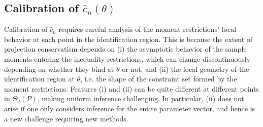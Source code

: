 \documentclass[letterpaper,11pt]{article}
\theoremstyle{myplain}
\theoremstyle{mydefinition}
\theoremstyle{myremark}
\numberwithin{equation}{section}
\numberwithin{figure}{section}
\begin{document}
\subsection{Calibration of $\hat{c}_n(\theta)$}\label{sec:boot}
Calibration of $\hat{c}_n$ requires careful analysis of the moment restrictions' local behavior at each point in the identification region.
This is because the extent of projection conservatism depends on (i) the asymptotic behavior of the sample moments entering the inequality restrictions, which can change discontinuously depending on whether they bind at $\theta$ or not, and (ii) the local geometry of the identification region at $\theta$, i.e. the shape of the constraint set formed by the moment restrictions. Features (i) and (ii) can be quite different at different points in $\Theta_I(P)$, making uniform inference challenging. In particular, (ii) does not arise if one only considers inference for the entire parameter vector, and hence is a new challenge requiring new methods.
\end{document}
